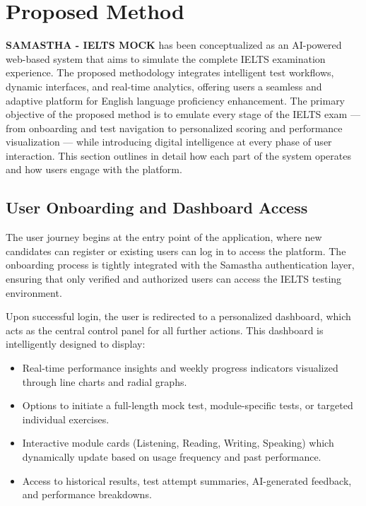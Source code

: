 \documentclass[a4paper,12pt]{article}
\begin{document}
\newpage
\section{Proposed Method}

\vspace{0.5cm}

\textbf{SAMASTHA - IELTS MOCK} has been conceptualized as an AI-powered web-based system that aims to simulate the complete IELTS examination experience. The proposed methodology integrates intelligent test workflows, dynamic interfaces, and real-time analytics, offering users a seamless and adaptive platform for English language proficiency enhancement. The primary objective of the proposed method is to emulate every stage of the IELTS exam — from onboarding and test navigation to personalized scoring and performance visualization — while introducing digital intelligence at every phase of user interaction. This section outlines in detail how each part of the system operates and how users engage with the platform.

\vspace{0.5cm}

\subsection{User Onboarding and Dashboard Access}

The user journey begins at the entry point of the application, where new candidates can register or existing users can log in to access the platform. The onboarding process is tightly integrated with the Samastha authentication layer, ensuring that only verified and authorized users can access the IELTS testing environment.

Upon successful login, the user is redirected to a personalized dashboard, which acts as the central control panel for all further actions. This dashboard is intelligently designed to display:
\begin{itemize}
    \item Real-time performance insights and weekly progress indicators visualized through line charts and radial graphs.
    \item Options to initiate a full-length mock test, module-specific tests, or targeted individual exercises.
    \item Interactive module cards (Listening, Reading, Writing, Speaking) which dynamically update based on usage frequency and past performance.
    \item Access to historical results, test attempt summaries, AI-generated feedback, and performance breakdowns.
\end{itemize}
\end{document}
